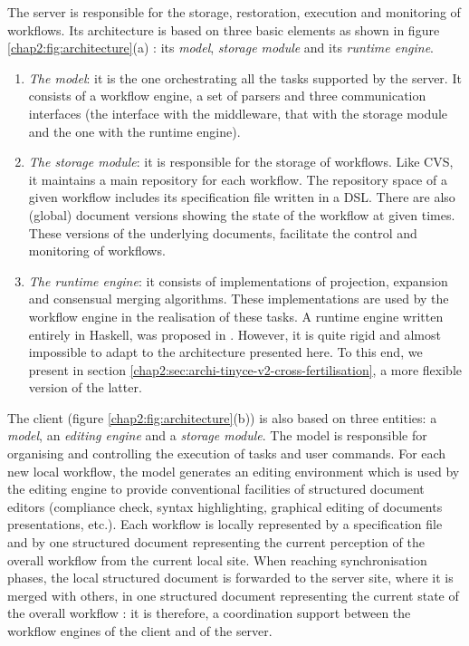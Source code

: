 \label{chap2:sec:archi-server-architecture}
The server is responsible for the storage, restoration, execution and monitoring of workflows. Its architecture is based on three basic elements as shown in figure \ref{chap2:fig:architecture}(a) : its \textit{model}, \textit{storage module} and its \textit{runtime engine}.
\begin{enumerate}
\item \textit{The model}: it is the one orchestrating all the tasks supported by the server. It consists of a workflow engine, a set of parsers and three communication interfaces (the interface with the middleware, that with the storage module and the one with the runtime engine).
\item \textit{The storage module}: it is responsible for the storage of workflows. Like CVS, it maintains a main repository for each workflow. The repository space of a given workflow includes its specification file written in a DSL. There are also (global) document versions showing the state of the workflow at given times. These versions of the underlying documents, facilitate the control and monitoring of workflows.
\item \textit{The runtime engine}: it consists of implementations of projection, expansion and consensual merging algorithms. These implementations are used by the workflow engine in the realisation of these tasks. A runtime engine written entirely in Haskell, was proposed in \cite{artTinyCE}. However, it is quite rigid and almost impossible to adapt to the architecture presented here. To this end, we present in section \ref{chap2:sec:archi-tinyce-v2-cross-fertilisation}, a more flexible version of the latter.
\end{enumerate}

\label{chap2:sec:archi-client-architecture}
The client (figure \ref{chap2:fig:architecture}(b)) is also based on three entities: a \textit{model}, an \textit{editing engine} and a \textit{storage module}. The model is responsible for organising and controlling the execution of tasks and user commands. For each new local workflow, the model generates an editing environment which is used by the editing engine to provide conventional facilities of structured document editors (compliance check, syntax highlighting, graphical editing of documents presentations, etc.). Each workflow is locally represented by a specification file and by one structured document representing the current perception of the overall workflow from the current local site. When reaching synchronisation phases, the local structured document is forwarded to the server site, where it is merged with others, in one structured document representing the current state of the overall workflow : it is therefore, a coordination support between the workflow engines of the client and of the server.


